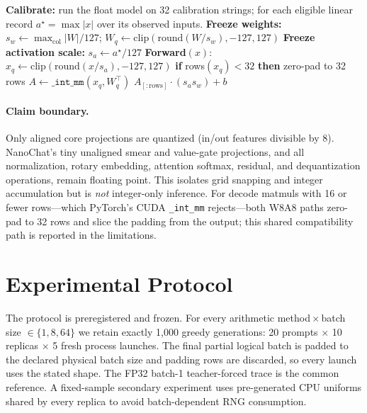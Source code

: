 \documentclass[10pt,twocolumn]{article}
\begin{document}
\begin{algorithm}[t]
\caption{Static W8A8 linear (per-channel weights, per-tensor frozen activation).}
\label{alg:w8a8}
\footnotesize
\begin{algorithmic}[1]
\State \textbf{Calibrate:} run the float model on 32 calibration strings; for each
eligible linear record $a^{\star}\!=\!\max|x|$ over its observed inputs.
\State \textbf{Freeze weights:} $s_w \gets \max_{\text{col}}|W| / 127$;\;
$W_q \gets \mathrm{clip}(\mathrm{round}(W / s_w), -127, 127)$
\State \textbf{Freeze activation scale:} $s_a \gets a^{\star} / 127$
\Statex \textbf{Forward}$(x)$:
\State $x_q \gets \mathrm{clip}(\mathrm{round}(x / s_a), -127, 127)$ 
\State \textbf{if} rows$(x_q)<32$ \textbf{then} zero-pad to 32 rows 
\State $A \gets \texttt{\_int\_mm}(x_q, W_q^\top)$ 
\State \Return $A_{[:\text{rows}]} \cdot (s_a s_w) + b$ 
\end{algorithmic}
\end{algorithm}

\paragraph{Claim boundary.} Only aligned core projections are quantized
(in/out features divisible by 8). NanoChat's tiny unaligned smear and value-gate
projections, and all normalization, rotary embedding, attention softmax,
residual, and dequantization operations, remain floating point. This isolates
grid snapping and integer accumulation but is \emph{not} integer-only inference.
For decode matmuls with 16 or fewer rows---which PyTorch's CUDA \texttt{\_int\_mm}
rejects---both W8A8 paths zero-pad to 32 rows and slice the padding from the
output; this shared compatibility path is reported in the limitations.

\section{Experimental Protocol}
The protocol is preregistered and frozen. For every arithmetic
method\,$\times$\,batch size $\in\{1,8,64\}$ we retain exactly 1{,}000 greedy
generations: 20 prompts $\times$ 10 replicas $\times$ 5 fresh process launches.
The final partial logical batch is padded to the declared physical batch size and
padding rows are discarded, so every launch uses the stated shape. The FP32
batch-1 teacher-forced trace is the common reference. A fixed-sample secondary
experiment uses pre-generated CPU uniforms shared by every replica to avoid
batch-dependent RNG consumption.
\end{document}
